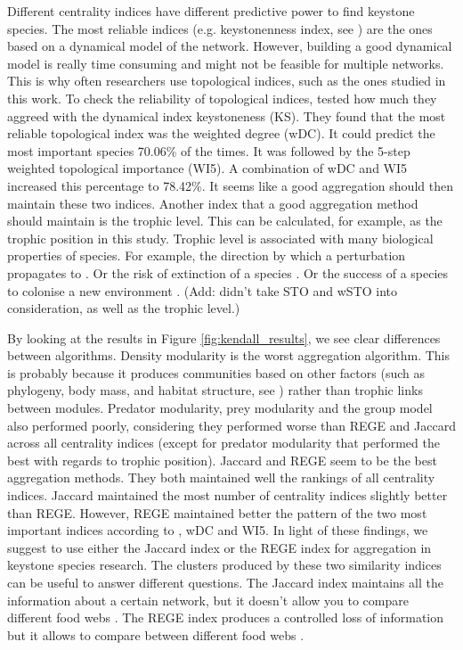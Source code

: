 \documentclass[twocolumn]{article}
\begin{document}
	Different centrality indices have different predictive power to find keystone species. The most reliable indices (e.g. keystonenness index, see \citep{Libralato2006}) are the ones based on a dynamical model of the network. However, building a good dynamical model is really time consuming and might not be feasible for multiple networks.	This is why often researchers use topological indices, such as the ones studied in this work. To check the reliability of topological indices, \citet{Gouveia2020} tested how much they aggreed with the dynamical index keystoneness (KS).	They found that the most reliable topological index was the weighted degree (wDC). It could predict the most important species 70.06\% of the times. It was followed by the 5-step weighted topological importance (WI5).	A combination of wDC and WI5 increased this percentage to 78.42\%. It seems like a good aggregation should then maintain these two indices. Another index that a good aggregation method should maintain is the trophic level. This can be calculated, for example, as the trophic position in this study. Trophic level is associated with many biological properties of species. For example, the direction by which a perturbation propagates to \citep{Curtsdotter2011}.	Or the risk of extinction of a species \citep{Binzer2011}. Or the success of a species to colonise a new environment \citep{Holt2010}. (Add: \citet{Gouveia2020} didn't take STO and wSTO into consideration, as well as the trophic level.)

	By looking at the results in Figure \ref{fig:kendall_results}, we see clear differences between algorithms. Density modularity is the worst aggregation algorithm. This is probably because it produces communities based on other factors (such as phylogeny, body mass, and habitat structure, see \citet{Rezende2009}) rather than trophic links between modules. Predator modularity, prey modularity and the group model also performed poorly, considering they performed worse than REGE and Jaccard across all centrality indices (except for predator modularity that performed the best with regards to trophic position). Jaccard and REGE seem to be the best aggregation methods.	They both maintained well the rankings of all centrality indices.	Jaccard maintained the most number of centrality indices slightly better than REGE.	However, REGE maintained better the pattern of the two most important indices according to \citet{Gouveia2020}, wDC and WI5. In light of these findings, we suggest to use either the Jaccard index or the REGE index for aggregation in keystone species research. The clusters produced by these two similarity indices can be useful to answer different questions. The Jaccard index maintains all the information about a certain network, but it doesn't allow you to compare different food webs \citep{Luczkovich2003}. The REGE index produces a controlled loss of information but it allows to compare between different food webs \citep{Luczkovich2003}.
\end{document}
